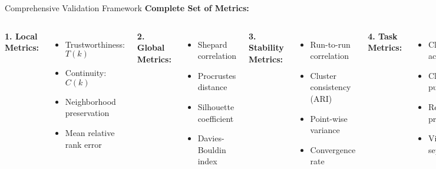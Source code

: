 \begin{frame}{Comprehensive Validation Framework}
\textbf{Complete Set of Metrics:}

\begin{columns}
\textbf{1. Local Metrics:}
\begin{itemize}
\item Trustworthiness: $T(k)$
\item Continuity: $C(k)$
\item Neighborhood preservation
\item Mean relative rank error
\end{itemize}

\textbf{2. Global Metrics:}
\begin{itemize}
\item Shepard correlation
\item Procrustes distance
\item Silhouette coefficient
\item Davies-Bouldin index
\end{itemize}

\textbf{3. Stability Metrics:}
\begin{itemize}
\item Run-to-run correlation
\item Cluster consistency (ARI)
\item Point-wise variance
\item Convergence rate
\end{itemize}

\textbf{4. Task Metrics:}
\begin{itemize}
\item Classification accuracy
\item Clustering purity
\item Retrieval precision
\item Visual separability
\end{itemize}
\end{columns}

\end{frame}

